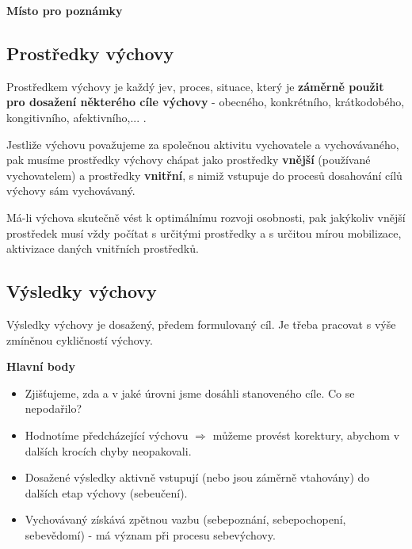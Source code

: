 \documentclass[a4paper,12pt,final]{report}
\begin{document}
\begin{samepage}\begin{flushleft}
\end{flushleft}
\textbf{Místo pro poznámky}
\vspace{5cm}\pagelogos
\end{samepage}

\subsection*{Prostředky výchovy}
Prostředkem výchovy je každý jev, proces, situace, který je \textbf{záměrně použit pro dosažení některého cíle výchovy} - obecného, konkrétního, krátkodobého, kongitivního, afektivního,... . 

Jestliže výchovu považujeme za společnou aktivitu vychovatele a vychovávaného, pak musíme prostředky výchovy chápat jako prostředky \textbf{vnější} (používané vychovatelem) a prostředky \textbf{vnitřní}, s nimiž vstupuje do procesů dosahování cílů výchovy sám vychovávaný.

Má-li výchova skutečně vést k optimálnímu rozvoji osobnosti, pak jakýkoliv vnější prostředek musí vždy počítat s určitými prostředky a s určitou mírou mobilizace, aktivizace daných vnitřních prostředků.

\subsection*{Výsledky výchovy}
Výsledky výchovy je dosažený, předem formulovaný cíl. Je třeba pracovat s výše zmíněnou cykličností výchovy.

\textbf{Hlavní body}
\begin{itemize}
 \item Zjišťujeme, zda a v jaké úrovni jsme dosáhli stanoveného cíle. Co se nepodařilo?
 \item Hodnotíme předcházející výchovu $\Rightarrow$ můžeme provést korektury, abychom v dalších krocích chyby neopakovali.
 \item Dosažené výsledky aktivně vstupují (nebo jsou záměrně vtahovány) do dalších etap výchovy (sebeučení).
 \item Vychovávaný získává zpětnou vazbu (sebepoznání, sebepochopení, sebevědomí) - má význam při procesu sebevýchovy.
\end{itemize}
\end{document}
